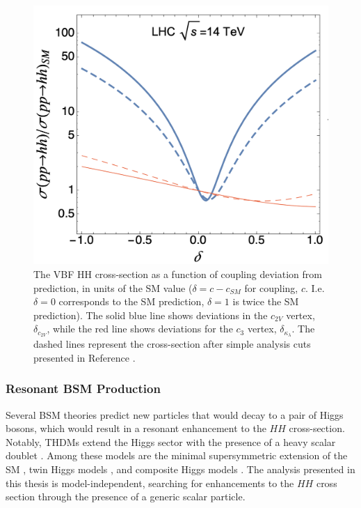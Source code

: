 \begin{figure}[!ht]
    \centering
    \includegraphics[width=.7\textwidth]{chapters/chapter1_theory/images/coupling_xsec.png}
    \caption[The VBF HH cross-section as a function of coupling deviation from the \gls{SM} prediction]{The VBF HH cross-section as a function of coupling deviation from prediction, in units of the \gls{SM} value ($\delta=c-c_{SM}$ for coupling, $c$. I.e. $\delta=0$ corresponds to the \gls{SM} prediction, $\delta=1$ is twice the \gls{SM} prediction). The solid blue line shows deviations in the $c_{2V}$ vertex, $\delta_{c_{2V}}$, while the red line shows deviations for the $c_{3}$ vertex, $\delta_{\kappa_{\lambda}}$. The dashed lines represent the cross-section after simple analysis cuts presented in Reference \cite{vbfhh}.}
    \label{fig:c2v-xsec}
\end{figure}



\subsubsection{Resonant BSM Production}

Several \gls{BSM} theories predict new particles that would decay to a pair of Higgs bosons, which would result in a resonant enhancement to the $HH$ cross-section. Notably, \glspl{THDM} extend the Higgs sector with the presence of a heavy scalar doublet \cite{THDM, thdm2}. Among these models are the minimal supersymmetric extension of the \gls{SM} \cite{mssm, hmssm2, hmssm3}, twin Higgs models \cite{twinHiggs, twinHiggs2}, and composite Higgs models \cite{compositeHiggs}. The analysis presented in this thesis is model-independent, searching for enhancements to the $HH$ cross section through the presence of a generic scalar particle.

